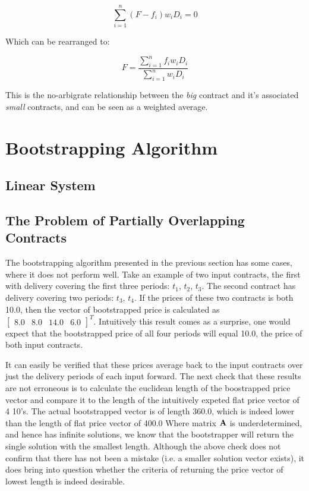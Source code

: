 \documentclass{article}
\begin{document}
\begin{equation}
    \sum_{i=1}^{n}(F-f_i) w_i D_i = 0
\end{equation}

Which can be rearranged to:

\begin{equation}
    F = \frac{\sum_{i=1}^{n}f_i w_i D_i}{\sum_{i=1}^{n}w_i D_i}
\end{equation}

This is the no-arbigrate relationship between the \emph{big} contract and it's associated
\emph{small} contracts, and can be seen as a weighted average.

\section{Bootstrapping Algorithm}

\subsection{Linear System}



\subsection{The Problem of Partially Overlapping Contracts}

The bootstrapping algorithm presented in the previous section has some cases, 
where it does not perform well. Take an example of two input contracts, the
first with delivery covering the first three periods: $t_1$, $t_2$, $t_3$. The second
contract has delivery covering two periods: $t_3$, $t_4$. If the prices of these
two contracts is both 10.0, then the vector of bootstrapped price is calculated
as $\begin{bmatrix}8.0 & 8.0 & 14.0 & 6.0\end{bmatrix}^T$. Intuitively this 
result comes as a surprise, one would expect that the bootstrapped price of
all four periods will equal 10.0, the price of both input contracts.

It can easily be verified that these prices average back to the input contracts
over just the delivery periods of each input forward. The next check
that these results are not erroneous is to calculate the euclidean length of
the boostrapped price vector and compare it to the length of the intuitively 
expeted flat price vector of 4 10's. The actual bootstrapped vector is of length 360.0, 
which is indeed lower than the length of flat price vector of 400.0 Where matrix
$\mathbf{A}$ is underdetermined, and hence has infinite solutions, we know that the 
bootstrapper will return the single solution with the smallest length. Although
the above check does not confirm that there has not been a mistake (i.e. a smaller
solution vector exists), it does bring into question whether the criteria of 
returning the price vector of lowest length is indeed desirable.
\end{document}
